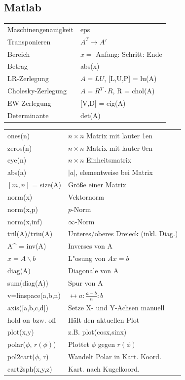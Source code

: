 \documentclass[a4paper,twocolumn]{article}
\begin{document}
\begin{appendix}
\section{Matlab}

	\renewcommand{\arraystretch}{1.2}
	\begin{tabular}{l | l}
		Maschinengenauigkeit    &   eps \\
		Transponieren           &   $A^T \rightarrow A'$\\
		Bereich                 &   $x =$ Anfang: Schritt: Ende \\
		Betrag                  &   abs(x)\\
		LR-Zerlegung            &   $A = LU$, [L,U,P] = lu(A)\\
		Cholesky-Zerlegung      &   $A = R^T \cdot R$, R = chol(A)\\
		EW-Zerlegung            &   [V,D] = eig(A)\\
		Determinante            &   det(A)
	\end{tabular}
	
	\vspace{3mm}

	\renewcommand{\arraystretch}{1.2}
	\begin{tabular}{l | l}
		ones(n)             &   $n \times n$ Matrix mit lauter 1en\\
		zeros(n)            &   $n \times n$ Matrix mit lauter 0en\\
		eye(n)              &   $n \times n$ Einheitsmatrix\\
		abs(a)				&	$|a|$, elementweise bei Matrix\\
		$[m,n]$ = size(A)   &   Größe einer Matrix\\
		norm(x)             &   Vektornorm\\
		norm(x,p)			&	$p$-Norm\\
		norm(x,inf)			&	$\infty$-Norm\\
		tril(A)/triu(A)     &   Unteres/oberes Dreieck (inkl. Diag.)\\
		A\^\;-1 = inv(A)    &   Inverses von A\\
		$x = A \backslash b$  & L"osung von $Ax=b$ \\
		diag(A) & Diagonale von A \\
		sum(diag(A))	&	Spur von A \\
		v=linspace(a,b,n)	&	$\leftrightarrow a:\frac{a-b}{n}:b$\\
		axis([a,b,c,d])		&	Setze X- und Y-Achsen manuell\\
		hold on bzw. off	&	Hält den aktuellen Plot\\
		plot(x,y)			& 	z.B. plot(cosx,sinx)\\
		polar($\phi$, $r(\phi)$)&Plottet $\phi$ gegen $r(\phi)$\\
		pol2cart($\phi$, r) &	Wandelt Polar in Kart. Koord.\\
		cart2sph(x,y,z)		&	Kart. nach Kugelkoord.
	\end{tabular}
	

\end{appendix}
\end{document}
